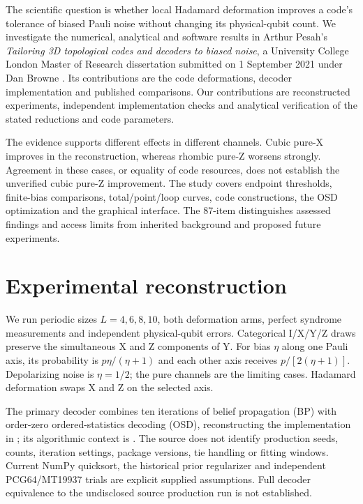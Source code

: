 The scientific question is whether local Hadamard deformation improves a code's tolerance of biased Pauli noise without changing its physical-qubit count. We investigate the numerical, analytical and software results in Arthur Pesah's \emph{Tailoring 3D topological codes and decoders to biased noise}, a University College London Master of Research dissertation submitted on 1 September 2021 under Dan Browne \citep{pesah2021}. Its contributions are the code deformations, decoder implementation and published comparisons. Our contributions are reconstructed experiments, independent implementation checks and analytical verification of the stated reductions and code parameters.

The evidence supports different effects in different channels. Cubic pure-X improves in the reconstruction, whereas rhombic pure-Z worsens strongly. Agreement in these cases, or equality of code resources, does not establish the unverified cubic pure-Z improvement. The study covers endpoint thresholds, finite-bias comparisons, total/point/loop curves, code constructions, the OSD optimization and the graphical interface. The 87-item  distinguishes assessed findings and access limits from inherited background and proposed future experiments.

\section{Experimental reconstruction}
We run periodic sizes $L=4,6,8,10$, both deformation arms, perfect syndrome measurements and independent physical-qubit errors. Categorical I/X/Y/Z draws preserve the simultaneous X and Z components of Y. For bias $\eta$ along one Pauli axis, its probability is $p\eta/(\eta+1)$ and each other axis receives $p/[2(\eta+1)]$. Depolarizing noise is $\eta=1/2$; the pure channels are the limiting cases. Hadamard deformation swaps X and Z on the selected axis.

The primary decoder combines ten iterations of belief propagation (BP) with order-zero ordered-statistics decoding (OSD), reconstructing the implementation in \citet{bn3d}; its algorithmic context is \citet{roffe2020}. The source does not identify production seeds, counts, iteration settings, package versions, tie handling or fitting windows. Current NumPy quicksort, the historical prior regularizer and independent PCG64/MT19937 trials are explicit supplied assumptions. Full decoder equivalence to the undisclosed source production run is not established.

